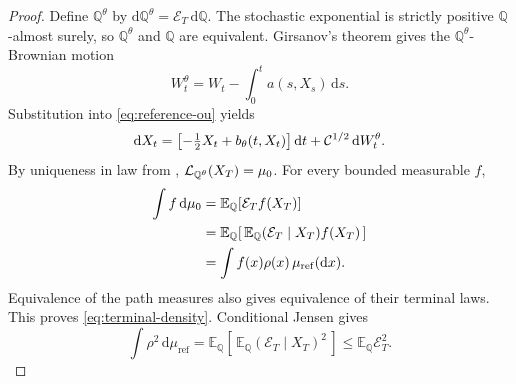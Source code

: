 \begin{proof}
Define $\mathbb Q^\theta$ by
$\mathrm d\mathbb Q^\theta=\mathcal E_T\,\mathrm d\mathbb Q$.
The stochastic exponential is strictly positive
$\mathbb Q$-almost surely, so $\mathbb Q^\theta$ and $\mathbb Q$ are
equivalent.
Girsanov's theorem gives the $\mathbb Q^\theta$-Brownian motion
\[
  W_t^\theta
  =W_t-\int_0^t a(s,X_s)\,\mathrm ds .
\]
Substitution into \eqref{eq:reference-ou} yields
\[
  \mathrm dX_t
  =\bigl[-\tfrac12X_t+{b_{\theta}}(t,X_t)\bigr]\,\mathrm dt
   +\mathcal C^{1/2}\,\mathrm dW_t^\theta.
\]
By uniqueness in law from ,
$\mathcal L_{\mathbb Q^\theta}(X_T)={\mu_{0}}$.  For every bounded
measurable $f$,
\begin{align*}
  \int f\,\mathrm d{\mu_{0}}
  &=\mathbb E_{\mathbb Q}[\mathcal E_T f(X_T)]\\
  &=\mathbb E_{\mathbb Q}
       [\,\mathbb E_{\mathbb Q}(\mathcal E_T\mid X_T)f(X_T)\,]\\
  &=\int f(x)\rho(x)\,\mu_{\mathrm{ref}}(\mathrm dx).
\end{align*}
Equivalence of the path measures also gives equivalence of their
terminal laws.  This proves \eqref{eq:terminal-density}.  Conditional
Jensen gives
\[
  \int\rho^2\,\mathrm d\mu_{\mathrm{ref}}
  =\mathbb E_{\mathbb Q}
     [\,\mathbb E_{\mathbb Q}(\mathcal E_T\mid X_T)^2\,]
  \leq\mathbb E_{\mathbb Q}\mathcal E_T^2.
\]
\end{proof}

